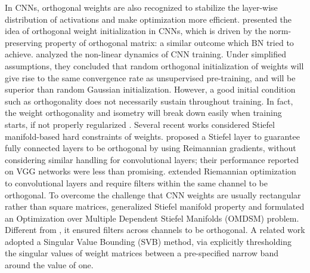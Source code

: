 \documentclass{article}
\newcounter{ass_counter}
\begin{document}
In CNNs, orthogonal weights are also recognized to stabilize the layer-wise distribution of activations \cite{rodriguez2016regularizing} and make optimization more efficient. \cite{saxe2013exact,mishkin2015all} presented the idea of orthogonal weight initialization in CNNs, which is driven by the norm-preserving property of orthogonal matrix: a similar outcome which BN tried to achieve. \cite{saxe2013exact} analyzed the non-linear dynamics of CNN training. Under simplified assumptions, they concluded that random orthogonal initialization of weights will give rise to the same convergence rate as unsupervised pre-training, and will be superior than random Gaussian initialization.
However, a good initial condition such as orthogonality does not necessarily sustain throughout training. In fact, the weight orthogonality and isometry will break down easily when training starts, if not properly regularized \cite{saxe2013exact}. Several recent works \cite{harandi2016generalized,ozay2016optimization,huang2017orthogonal} considered Stiefel manifold-based hard constraints of weights. \cite{harandi2016generalized} proposed a Stiefel layer to guarantee fully connected layers to be orthogonal by using Reimannian gradients, without considering similar handling for convolutional layers; their performance reported on VGG networks \cite{simonyan2014very} were less than promising. \cite{ozay2016optimization} extended Riemannian optimization to convolutional layers and require filters within the same channel to be orthogonal. To overcome the challenge that CNN weights are usually rectangular rather than square matrices, \cite{huang2017orthogonal} generalized Stiefel manifold property and formulated an Optimization over Multiple Dependent Stiefel Manifolds (OMDSM) problem. Different from \cite{ozay2016optimization}, it ensured filters across channels to be orthogonal. A related work \cite{jia2016improving} adopted a Singular Value Bounding (SVB) method, via explicitly thresholding the singular values of weight matrices between a pre-specified narrow band around the value of one.
\end{document}
